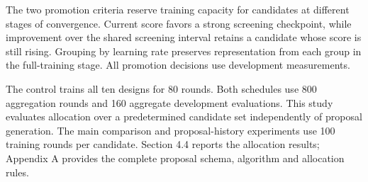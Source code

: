 The two promotion criteria reserve training capacity for candidates at different stages of convergence. Current score favors a strong screening checkpoint, while improvement over the shared screening interval retains a candidate whose score is still rising. Grouping by learning rate preserves representation from each group in the full-training stage. All promotion decisions use development measurements.

The control trains all ten designs for 80 rounds. Both schedules use 800 aggregation rounds and 160 aggregate development evaluations. This study evaluates allocation over a predetermined candidate set independently of proposal generation. The main comparison and proposal-history experiments use 100 training rounds per candidate. Section 4.4 reports the allocation results; Appendix A provides the complete proposal schema, algorithm and allocation rules.
